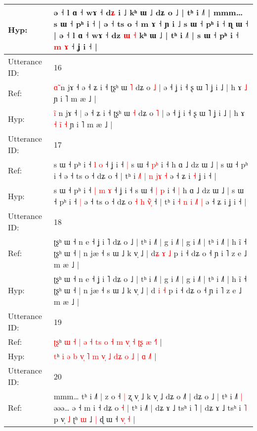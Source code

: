 \documentclass[10pt]{article}
\DeclareRobustCommand{\hl}[1]{{\textcolor{red}{#1}}}
\begin{document}
\begin{longtable}{ll}
Hyp: & ə ˧ l ɑ ˧\hl{}\hl{} wɤ ˧ d\hl{ʑ} i ˩ kʰ ɯ ˩ dʑ o ˩ | tʰ i ˩˥ | mmm… s ɯ ˧ pʰ i ˧ | ə ˧ ts o ˧ m ɤ ˧ ɲ i ˩\hl{}\hl{} s ɯ ˧ pʰ i ˧ ɳ ɯ ˧ | ə ˧ l ɑ ˧\hl{}\hl{} wɤ ˧ dz \hl{ɯ} \hl{˧} kʰ ɯ ˩ | tʰ i ˩˥ | s ɯ ˧ pʰ i ˧ \hl{m} \hl{ɤ} ˧ ʝ i ˧ |
 \\
\midrule
Utterance ID: & 16 \\
Ref: & \hl{ɑ}̃ n jɤ ˧\hl{}\hl{} ə ˧ ʑ i ˧ ʈʂʰ ɯ \hl{˥} dʑ o \hl{˩} | ə ˧ ʝ i ˧ ʂ ɯ ˥ ʝ i ˩ | h ɤ\hl{}\hl{}\hl{}\hl{}\hl{} \hl{˩} ɲ i ˥ m æ ˩ |
 \\
Hyp: & \hl{i}̃ n jɤ ˧\hl{ }\hl{|} ə ˧ ʑ i ˧ ʈʂʰ ɯ \hl{˧} dʑ o \hl{˥} | ə ˧ ʝ i ˧ ʂ ɯ ˥ ʝ i ˩ | h ɤ\hl{ }\hl{˧}\hl{ }\hl{i}\hl{̃} \hl{˧} ɲ i ˥ m æ ˩ |
 \\
\midrule
Utterance ID: & 17 \\
Ref: & s ɯ ˧ pʰ i ˧\hl{}\hl{} \hl{l} \hl{o} ˧ ʝ i ˧\hl{ }\hl{|} s ɯ ˧ \hl{}\hl{p}\hl{ʰ} i ˧\hl{}\hl{} h ɑ ˩ dz ɯ ˩ | s ɯ ˧ pʰ i ˧\hl{}\hl{} ə ˧ ts o ˧ dʑ o\hl{}\hl{}\hl{}\hl{}\hl{}\hl{}\hl{}\hl{} ˧ | tʰ i \hl{˩}\hl{˥} \hl{|} \hl{n} \hl{j}\hl{ɤ} \hl{˧} ə ˧ ʑ i\hl{ }\hl{˧} ʝ i ˧ |
 \\
Hyp: & s ɯ ˧ pʰ i ˧\hl{ }\hl{|} \hl{m} \hl{ɤ} ˧ ʝ i ˧\hl{}\hl{} s ɯ ˧ \hl{|}\hl{ }\hl{p} i ˧\hl{ }\hl{|} h ɑ ˩ dz ɯ ˩ | s ɯ ˧ pʰ i ˧\hl{ }\hl{|} ə ˧ ts o ˧ dʑ o\hl{ }\hl{˧}\hl{ }\hl{h}\hl{ }\hl{v}\hl{̃}\hl{̩} ˧ | tʰ i \hl{}\hl{˧} \hl{n} \hl{i} \hl{˩}\hl{˥} \hl{|} ə ˧ ʑ i\hl{}\hl{} ʝ i ˧ |
 \\
\midrule
Utterance ID: & 18 \\
Ref: & ʈʂʰ ɯ ˧ n e ˧ ʝ i ˥ dʑ o ˩ | tʰ i ˩˥ | g i ˩˥ | g i ˩˥ | tʰ i ˩˥ | h ĩ ˧ ʈʂʰ ɯ ˧ | n jæ ˧ s ɯ ˩ k v̩ ˩ | d\hl{ʑ} \hl{ɤ} \hl{˩} p i ˧ dʑ o ˧ ɲ i ˥ z e ˩ m æ ˩ |
 \\
Hyp: & ʈʂʰ ɯ ˧ n e ˧ ʝ i ˥ dʑ o ˩ | tʰ i ˩˥ | g i ˩˥ | g i ˩˥ | tʰ i ˩˥ | h ĩ ˧ ʈʂʰ ɯ ˧ | n jæ ˧ s ɯ ˩ k v̩ ˩ | d\hl{} \hl{i} \hl{˧} p i ˧ dʑ o ˧ ɲ i ˥ z e ˩ m æ ˩ |
 \\
\midrule
Utterance ID: & 19 \\
Ref: & \hl{ʈ}\hl{ʂ}ʰ \hl{ɯ} \hl{˧} \hl{|} \hl{}\hl{ə} \hl{˧} \hl{t}\hl{s} \hl{o}\hl{ }\hl{˧} \hl{m} \hl{v}\hl{̩} \hl{˧} \hl{}\hl{ʈ}\hl{ʂ} \hl{æ} \hl{˧}˥ |
 \\
Hyp: & \hl{}\hl{t}ʰ \hl{i} \hl{ə} \hl{b} \hl{v}\hl{̩} \hl{˥} \hl{}\hl{m} \hl{}\hl{v}\hl{̩} \hl{˩} \hl{d}\hl{ʑ} \hl{o} \hl{˩}\hl{ }\hl{|} \hl{ɑ} \hl{˩}˥ |
 \\
\midrule
Utterance ID: & 20 \\
Ref: & mmm… tʰ i ˩˥ | z o ˧\hl{ }\hl{|} ʐ v̩ ˩ k v̩ ˩ dʑ o ˩˥ | dʑ o ˩ | tʰ i ˩˥\hl{ }\hl{|} əəə… ə ˧ m i ˧ dʑ o \hl{˧} | tʰ i ˩˥ | dʑ ɤ ˩ tsʰ i \hl{}˥ | dʑ ɤ ˩ tsʰ i \hl{˥} p v̩ \hl{˩} ʈʰ \hl{ɯ} ˩\hl{ }\hl{|} ɖ ɯ ˧ \hl{v}\hl{̩} \hl{˧} |

\end{longtable}
\end{document}
